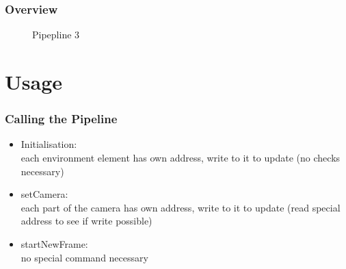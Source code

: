 \documentclass{beamer}
\begin{document}
\begin{frame} %
	\frametitle{Overview} %
	\begin{figure}[h]
		\centering
		\caption{Pipepline 3}
	\end{figure}
\end{frame}

\section{Usage}
\begin{frame} %
	\frametitle{Calling the Pipeline} %
	\begin{itemize}
		\item Initialisation:\\
		each environment element has own address, write to it to update (no checks necessary)
		\item setCamera:\\
		each part of the camera has own address, write to it to update (read special address to see if write possible)
		\item startNewFrame:\\
		no special command necessary
	\end{itemize}
\end{frame}
\end{document}
